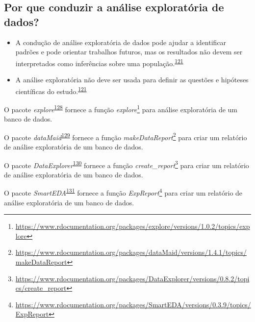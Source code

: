 \documentclass[
  a4paper,
]{book}
\renewcommand{\href}[2]{#2\footnote{\url{#1}}}
\newenvironment{infobox}[1]
  {
  \begin{itemize}
  \renewcommand{\labelitemi}{
    \raisebox{-.7\height}[0pt][0pt]{
      {\setkeys{Gin}{width=3em,keepaspectratio}
        \texttt{[image: \#1]}}
    }
  }
  \setlength{\fboxsep}{1em}
  \begin{blackbox}
  \item
  }
  {
  \end{blackbox}
  \end{itemize}
  }
\begin{document}
\hypertarget{por-que-conduzir-a-anuxe1lise-exploratuxf3ria-de-dados}{%
\subsection{Por que conduzir a análise exploratória de dados?}\label{por-que-conduzir-a-anuxe1lise-exploratuxf3ria-de-dados}}

\begin{itemize}
\item
  A condução de análise exploratória de dados pode ajudar a identificar padrões e pode orientar trabalhos futuros, mas os resultados não devem ser interpretados como inferências sobre uma população.\textsuperscript{\protect\hyperlink{ref-zuur2009}{121}}
\item
  A análise exploratória não deve ser usada para definir as questões e hipóteses científicas do estudo.\textsuperscript{\protect\hyperlink{ref-zuur2009}{121}}
\end{itemize}

\begin{infobox}{images/Rlogo}
O pacote \emph{explore}\textsuperscript{\protect\hyperlink{ref-explore}{128}} fornece a função \href{https://www.rdocumentation.org/packages/explore/versions/1.0.2/topics/explore}{\emph{explore}} para análise exploratória de um banco de dados.

\end{infobox}

\begin{infobox}{images/Rlogo}
O pacote \emph{dataMaid}\textsuperscript{\protect\hyperlink{ref-dataMaid}{129}} fornece a função \href{https://www.rdocumentation.org/packages/dataMaid/versions/1.4.1/topics/makeDataReport}{\emph{makeDataReport}} para criar um relatório de análise exploratória de um banco de dados.

\end{infobox}

\begin{infobox}{images/Rlogo}
O pacote \emph{DataExplorer}\textsuperscript{\protect\hyperlink{ref-DataExplorer-2}{130}} fornece a função \href{https://www.rdocumentation.org/packages/DataExplorer/versions/0.8.2/topics/create_report}{\emph{create\_report}} para criar um relatório de análise exploratória de um banco de dados.

\end{infobox}

\begin{infobox}{images/Rlogo}
O pacote \emph{SmartEDA}\textsuperscript{\protect\hyperlink{ref-SmartEDA}{131}} fornece a função \href{https://www.rdocumentation.org/packages/SmartEDA/versions/0.3.9/topics/ExpReport}{\emph{ExpReport}} para criar um relatório de análise exploratória de um banco de dados.

\end{infobox}
\end{document}
